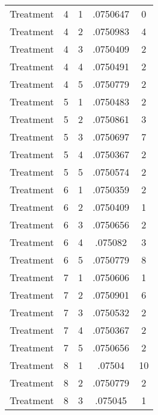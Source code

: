 \begin{tabular}{l*{4}{c}}
Treatment           &           4&           1&    .0750647&           0\\
Treatment           &           4&           2&    .0750983&           4\\
Treatment           &           4&           3&    .0750409&           2\\
Treatment           &           4&           4&    .0750491&           2\\
Treatment           &           4&           5&    .0750779&           2\\
Treatment           &           5&           1&    .0750483&           2\\
Treatment           &           5&           2&    .0750861&           3\\
Treatment           &           5&           3&    .0750697&           7\\
Treatment           &           5&           4&    .0750367&           2\\
Treatment           &           5&           5&    .0750574&           2\\
Treatment           &           6&           1&    .0750359&           2\\
Treatment           &           6&           2&    .0750409&           1\\
Treatment           &           6&           3&    .0750656&           2\\
Treatment           &           6&           4&     .075082&           3\\
Treatment           &           6&           5&    .0750779&           8\\
Treatment           &           7&           1&    .0750606&           1\\
Treatment           &           7&           2&    .0750901&           6\\
Treatment           &           7&           3&    .0750532&           2\\
Treatment           &           7&           4&    .0750367&           2\\
Treatment           &           7&           5&    .0750656&           2\\
Treatment           &           8&           1&      .07504&          10\\
Treatment           &           8&           2&    .0750779&           2\\
Treatment           &           8&           3&     .075045&           1\\

\end{tabular}
